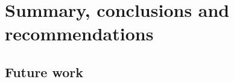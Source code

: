 \section{Summary, conclusions and recommendations}\label{sec:conclusion}


\subsection{Future work}

